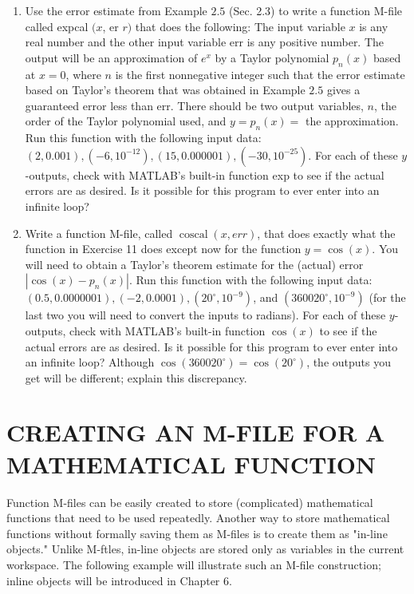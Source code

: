 \documentclass[../main.tex]{subfiles}
\begin{document}
\begin{enumerate}
\item Use the error estimate from Example $2.5$ (Sec. 2.3) to write a function M-file called expcal $(x$, er $r)$ that does the following: The input variable $x$ is any real number and the other input variable err is any positive number. The output will be an approximation of $e^{x}$ by a Taylor polynomial $p_{n}(x)$ based at $x=0$, where $n$ is the first nonnegative integer such that the error estimate based on Taylor's theorem that was obtained in Example $2.5$ gives a guaranteed error less than err. There should be two output variables, $n$, the order of the Taylor polynomial used, and $y=p_{n}(x)=$ the approximation. Run this function with the following input data: $(2,0.001),\left(-6,10^{-12}\right),(15,0.000001),\left(-30,10^{-25}\right)$. For each of these $y$-outputs, check with MATLAB's built-in function exp to see if the actual errors are as desired. Is it possible for this program to ever enter into an infinite loop?

 \item Write a function M-file, called $\operatorname{coscal}(x, e r r)$, that does exactly what the function in Exercise 11 does except now for the function $y=\cos (x)$. You will need to obtain a Taylor's theorem estimate for the (actual) error $\left|\cos (x)-p_{n}(x)\right|$. Run this function with the following input data: $(0.5,0.0000001),(-2,0.0001),\left(20^{\circ}, 10^{-9}\right)$, and $\left(360020^{\circ}, 10^{-9}\right)$ (for the last two you will need to convert the inputs to radians). For each of these $y$-outputs, check with MATLAB's built-in function $\cos (x)$ to see if the actual errors are as desired. Is it possible for this program to ever enter into an infinite loop? Although $\cos \left(360020^{\circ}\right)=\cos \left(20^{\circ}\right)$, the outputs you get will be different; explain this discrepancy.

\end{enumerate}

\section{ CREATING AN M-FILE FOR A MATHEMATICAL FUNCTION}

Function M-files can be easily created to store (complicated) mathematical functions that need to be used repeatedly. Another way to store mathematical functions without formally saving them as M-files is to create them as "in-line objects." Unlike M-ftles, in-line objects are stored only as variables in the current workspace. The following example will illustrate such an M-file construction; inline objects will be introduced in Chapter 6.
\end{document}
